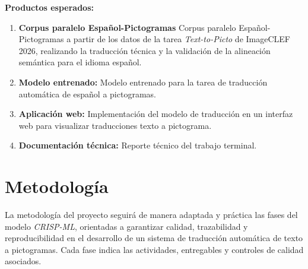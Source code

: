 \documentclass[10pt,letterpaper]{article}
\begin{document}
\textbf{Productos esperados:}

\begin{enumerate}
    \item \textbf{Corpus paralelo Español-Pictogramas} Corpus paralelo Español-Pictogramas a partir de los datos de la tarea \textit{Text-to-Picto} de ImageCLEF 2026, realizando la traducción técnica y la validación de la alineación semántica para el idioma español.
    
    \item \textbf{Modelo entrenado:} Modelo entrenado para la tarea de traducción automática de español a pictogramas.

    \item \textbf{Aplicación web:} Implementación del modelo de traducción en un interfaz web para visualizar traducciones texto a pictograma. 

    \item \textbf{Documentación técnica:} Reporte técnico del trabajo terminal.

\end{enumerate}

\section{Metodología}

La metodología del proyecto seguirá de manera adaptada y práctica las fases del modelo \textit{CRISP-ML}, orientadas a garantizar calidad, trazabilidad y reproducibilidad en el desarrollo de un sistema de traducción automática de texto a pictogramas. Cada fase indica las actividades, entregables y controles de calidad asociados.
\end{document}
